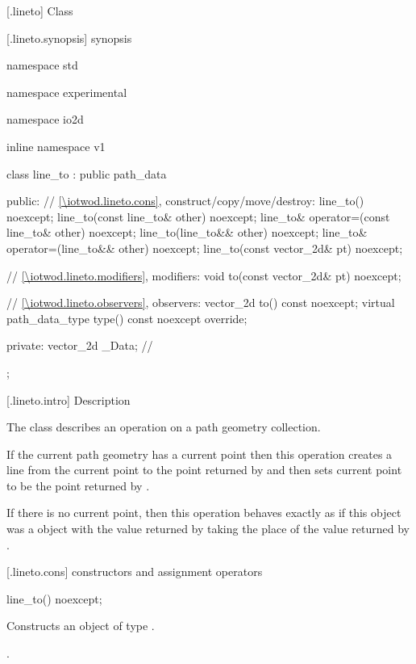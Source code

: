  [\iotwod.lineto] {Class }

 [\iotwod.lineto.synopsis] { synopsis}

\begin{codeblock}
namespace std { namespace experimental { namespace io2d { inline namespace v1 {
  class line_to : public path_data {
  public:
    // \ref{\iotwod.lineto.cons}, construct/copy/move/destroy:
    line_to() noexcept;
    line_to(const line_to& other) noexcept;
    line_to& operator=(const line_to& other) noexcept;
    line_to(line_to&& other) noexcept;
    line_to& operator=(line_to&& other) noexcept;
    line_to(const vector_2d& pt) noexcept;

    // \ref{\iotwod.lineto.modifiers}, modifiers:
    void to(const vector_2d& pt) noexcept;

    // \ref{\iotwod.lineto.observers}, observers:
    vector_2d to() const noexcept;
    virtual path_data_type type() const noexcept override;
    
  private:
    vector_2d _Data; // \expos
  };
} } } }
\end{codeblock}

 [\iotwod.lineto.intro] { Description}

\pnum
{}
The class  describes an operation on a path geometry collection.

\pnum
If the current path geometry has a current point then this operation creates a line from the current point to the point returned by  and then sets current point to be the point returned by .

\pnum
If there is no current point, then this operation behaves exactly as if this object was a  object with the value returned by  taking the place of the value returned by .

 [\iotwod.lineto.cons] { constructors and assignment operators}

\begin{itemdecl}
    line_to() noexcept;
\end{itemdecl}
\begin{itemdescr}
	\pnum
	\effects
	Constructs an object of type .
	
	\pnum
	\postconditions
	.
\end{itemdescr}

